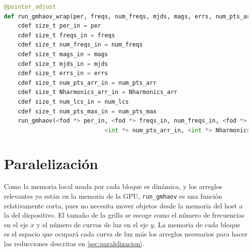 \begin{lstlisting}[language=Python]
@pointer_adjust
def run_gmhaov_wrap(per, freqs, num_freqs, mjds, mags, errs, num_pts_arr, Nharmonics_arr, num_lcs, num_pts_max,  wmeans_arr, wvars_arr):
    cdef size_t per_in = per
    cdef size_t freqs_in = freqs
    cdef size_t num_freqs_in = num_freqs
    cdef size_t mags_in = mags
    cdef size_t mjds_in = mjds
    cdef size_t errs_in = errs
    cdef size_t num_pts_arr_in = num_pts_arr
    cdef size_t Nharmonics_arr_in = Nharmonics_arr
    cdef size_t num_lcs_in = num_lcs
    cdef size_t num_pts_max_in = num_pts_max
    run_gmhaov(<fod *> per_in, <fod *> freqs_in, num_freqs_in, <fod *> mags_in, <fod *> mjds_in, <fod *> errs_in,
                             <int *> num_pts_arr_in, <int *> Nharmonics_arr_in, num_lcs, num_pts_max_in, <float *> wmeans_arr_in, <float *> wvars_arr_in)
\end{lstlisting}

\section{Paralelización}\label{sec:paralelización-implementacion}
Como la memoria local usada por cada bloque es dinámica, y los arreglos relevantes ya están en la memoria de la GPU, \texttt{run\_gmhaov} es una función relativamente corta, pues no necesita mover objetos desde la memoria del host a la del dispositivo. El tamaño de la grilla se escoge como el número de frecuencias en el eje $x$ y el número de curvas de luz en el eje $y$. La memoria de cada bloque es el espacio que ocupará cada curva de luz más los arreglos necesarios para hacer las reducciones descritas en \ref{sec:paralelizacion}.

